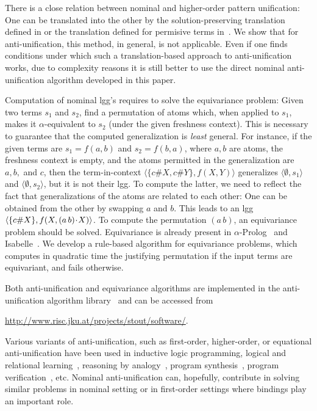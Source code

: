 \documentclass[11pt,a4paper]{amsart}
\theoremstyle{definition}
\newcommand{\swap}[2]{\ensuremath{(#1\, #2)}}
\newcommand{\permap}{{\mkern 1mu\cdot \mkern 1mu}}
\newcommand{\np}[2]{\langle #1, \allowbreak #2\rangle}
\begin{document}
There is a close relation between nominal and higher-order pattern
unification: One can be translated into the other by the
solution-preserving translation defined in \cite{cheney2005,
  DBLP:conf/rta/LevyV08, DBLP:journals/tocl/LevyV12} or the
translation defined for permisive terms
in~\cite{dowek09,DBLP:journals/igpl/DowekGM10}. We show that for
anti-unification, this method, in general, is not applicable.
Even if one finds conditions under which such a translation-based
approach to anti-unification works, due to complexity reasons it is
still better to use the direct nominal anti-unification algorithm
developed in this paper.

Computation of nominal lgg's requires to solve the equivariance
problem: Given two terms $s_1$ and $s_2$, find a permutation of atoms
which, when applied to $s_1$, makes it $\alpha$-equivalent to $s_2$
(under the given freshness context). This is necessary to guarantee
that the computed generalization is \emph{least} general. For
instance, if the given terms are $s_1=f(a,b)$ and $s_2=f(b,a)$, where
$a,b$ are atoms, the freshness context is empty, and the atoms
permitted in the generalization are $a,b,$ and $c$, then the
term-in-context $\np{\{c\#X, c\#Y\}}{f(X,Y)}$ generalizes
$\np{\emptyset}{s_1}$ and $\np{\emptyset}{s_2}$, but it is not their
lgg. To compute the latter, we need to reflect the fact that
generalizations of the atoms are related to each other: One can be
obtained from the other by swapping $a$ and $b$. This leads to an lgg
$\np{\{c\#X\}}{f(X,\swap{a}{b}\permap X)}$. To compute the permutation
$\swap{a}{b}$, an equivariance problem should be solved. Equivariance is
already present in $\alpha$-Prolog~\cite{alphaprolog} and 
Isabelle~\cite{isabelle}.  We develop a rule-based algorithm
for equivariance problems, which computes in quadratic time the
justifying permutation if the input terms are equivariant, and fails
otherwise. 

Both anti-unification and equivariance algorithms are implemented in the anti-unification algorithm library~\cite{DBLP:conf/jelia/BaumgartnerK14} and can be accessed from

\url{http://www.risc.jku.at/projects/stout/software/}.


Various variants of anti-unification, such as first-order,
higher-order, or equational anti-unification have been used in
inductive logic programming, logical and relational
learning~\cite{DeRaedt2008}, reasoning by
analogy~\cite{DBLP:conf/ausai/KrumnackSGK07}, program
synthesis~\cite{DBLP:books/sp/Schmid03}, program
verification~\cite{DBLP:journals/amai/LuMHH00}, etc. Nominal
anti-unification can, hopefully, contribute in solving similar
problems in nominal setting or in first-order settings where bindings play
an important role.
\end{document}
